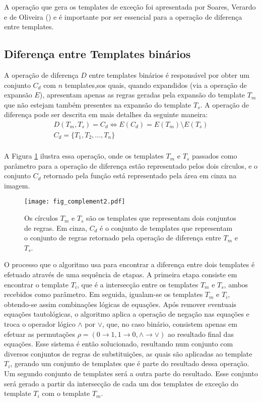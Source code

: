 A operação que gera os templates de exceção foi apresentada por Soares, Verardo e
de Oliveira (\citeyear{soares2016difference}) e é importante por ser essencial para a operação de diferença entre templates.

\subsection{Diferença entre Templates binários}
A operação de diferença $D$ entre templates binários é responsável por obter um conjunto $C_d$ com $n$ templates,sos quais, quando expandidos (via a operação de expansão $E$), apresentam apenas as regras geradas pela expansão do template $T_m$ que não estejam também presentes na expansão do template $T_s$. A operação de diferença pode ser descrita em mais detalhes da seguinte maneira:
\begin{equation}
\begin{split}
D(T_m,T_s)= C_d \Leftrightarrow E(C_d) = E(T_m) \setminus E(T_s) \\
C_d = \{T_1,T_2,\dots, T_n\}\\
\end{split}
\end{equation}

A Figura \ref{fig:complement} ilustra essa operação, onde os templates $T_m$ e $T_s$ passados como parâmetro para a operação de diferença estão representado pelos dois círculos, e o conjunto $C_d$ retornado pela função está representado pela área em cinza na imagem.
\begin{figure}[h!]
  \centering
  \texttt{[image: fig\_complement2.pdf]}
  \caption{Os círculos $T_m$ e $T_s$ são os templates que representam dois conjuntos de regras. Em cinza, $C_d$ é o conjunto de templates que representam o conjunto de regras retornado pela operação de diferença entre $T_m$ e $T_s$.}
  \label{fig:complement}
\end{figure}    

O processo que o algoritmo usa para encontrar a diferença entre dois templates é efetuado através de uma sequência de etapas. A primeira etapa consiste em encontrar o template $T_i$, que é a intersecção entre os templates $T_m$ e $T_s$, ambos recebidos como parâmetro. Em seguida, igualam-se os templates $T_m$ e $T_i$, obtendo-se assim combinações lógicas de equações. Após remover eventuais equações tautológicas, o algoritmo aplica a operação de negação nas equações e troca o operador lógico $\wedge$ por $\vee$, que, no caso binário, consistem apenas em efetuar as permutações $\rho = (0 \rightarrow 1, 1 \rightarrow 0, \wedge \rightarrow \vee)$ ao resultado final das equações. Esse sistema é então solucionado, resultando num conjunto com diversos conjuntos de regras de substituições, as quais são aplicadas ao template $T_i$, gerando um conjunto de templates que é parte do resultado dessa operação. Um segundo conjunto de templates será a outra parte do resultado. Esse conjunto será gerado a partir da intersecção de cada um dos templates de exceção do template $T_i$ com o template $T_m$.

